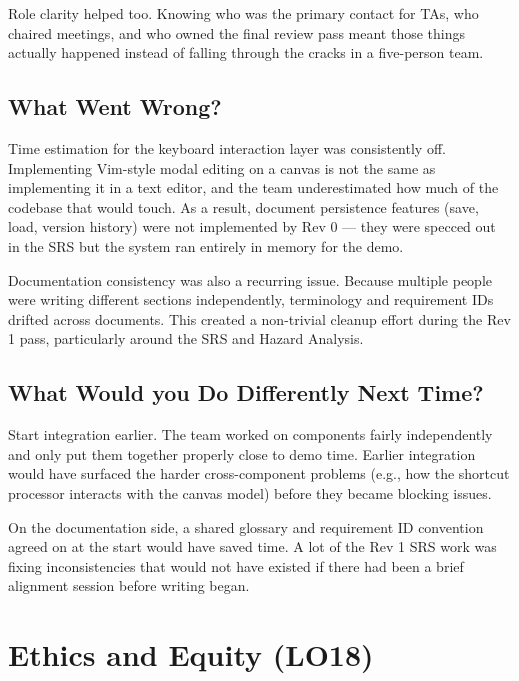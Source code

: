 \documentclass{article}
\begin{document}
Role clarity helped too. Knowing who was the primary contact for TAs, who chaired meetings, and who owned the final review pass meant those things actually happened instead of falling through the cracks in a five-person team.

\subsection{What Went Wrong?}

Time estimation for the keyboard interaction layer was consistently off. Implementing Vim-style modal editing on a canvas is not the same as implementing it in a text editor, and the team underestimated how much of the codebase that would touch. As a result, document persistence features (save, load, version history) were not implemented by Rev 0 --- they were specced out in the SRS but the system ran entirely in memory for the demo.

Documentation consistency was also a recurring issue. Because multiple people were writing different sections independently, terminology and requirement IDs drifted across documents. This created a non-trivial cleanup effort during the Rev 1 pass, particularly around the SRS and Hazard Analysis.

\subsection{What Would you Do Differently Next Time?}

Start integration earlier. The team worked on components fairly independently and only put them together properly close to demo time. Earlier integration would have surfaced the harder cross-component problems (e.g., how the shortcut processor interacts with the canvas model) before they became blocking issues.

On the documentation side, a shared glossary and requirement ID convention agreed on at the start would have saved time. A lot of the Rev 1 SRS work was fixing inconsistencies that would not have existed if there had been a brief alignment session before writing began.

\section{Ethics and Equity (LO18)}

\end{document}

